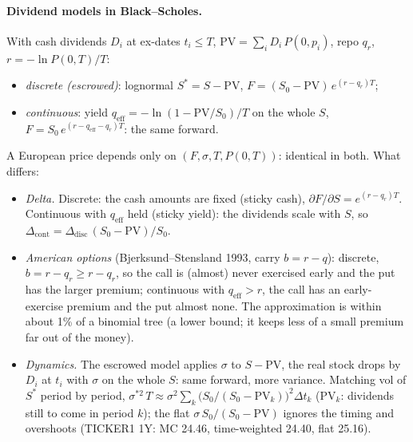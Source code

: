 \paragraph{Dividend models in Black--Scholes.} 
With cash dividends $D_i$ at ex-dates $t_i \le T$, $\mathrm{PV} = \sum_i D_i\,P(0,p_i)$, repo $q_r$, $r = -\ln P(0,T)/T$:
\begin{itemize}[nosep]
  \item \emph{discrete (escrowed)}: lognormal $S^* = S - \mathrm{PV}$, $F = (S_0 - \mathrm{PV})\,e^{(r - q_r)T}$;
  \item \emph{continuous}: yield $q_{\mathrm{eff}} = -\ln(1 - \mathrm{PV}/S_0)/T$ on the whole $S$,
        $F = S_0\,e^{(r - q_{\mathrm{eff}} - q_r)T}$: the same forward.
\end{itemize}
A European price depends only on $(F, \sigma, T, P(0,T))$: identical in both. What differs:
\begin{itemize}[nosep]
  \item \emph{Delta.} Discrete: the cash amounts are fixed (sticky cash), $\partial F/\partial S = e^{(r-q_r)T}$.
        Continuous with $q_{\mathrm{eff}}$ held (sticky yield): the dividends scale with $S$, so
        $\Delta_{\mathrm{cont}} = \Delta_{\mathrm{disc}}\,(S_0 - \mathrm{PV})/S_0$.
  \item \emph{American options} (Bjerksund--Stensland 1993, carry $b = r - q$): discrete, $b = r - q_r \ge r - q_r$, so
        the call is (almost) never exercised early and the put has the larger premium; continuous with
        $q_{\mathrm{eff}} > r$, the call has an early-exercise premium and the put almost none. The approximation is
        within about 1\% of a binomial tree (a lower bound; it keeps less of a small premium far out of the money).
  \item \emph{Dynamics.} The escrowed model applies $\sigma$ to $S - \mathrm{PV}$, the real stock drops by $D_i$ at
        $t_i$ with $\sigma$ on the whole $S$: same forward, more variance. Matching vol of $S^*$ period by period,
        $\sigma^{*2}\,T \approx \sigma^2 \sum_k \big(S_0/(S_0 - \mathrm{PV}_k)\big)^2 \Delta t_k$ ($\mathrm{PV}_k$: dividends still
        to come in period $k$); the flat $\sigma\,S_0/(S_0 - \mathrm{PV})$ ignores the timing and overshoots
        (TICKER1 1Y: MC 24.46, time-weighted 24.40, flat 25.16).
\end{itemize}

